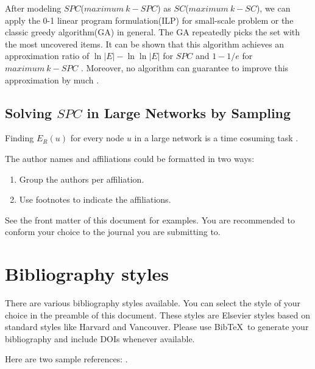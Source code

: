 \documentclass[review]{elsarticle}
\begin{document}
After modeling $SPC$($maximum \  k-SPC$) as $SC$($maximum \  k-SC$), we can apply the 0-1 linear program formulation(ILP) \cite{vazirani2013approximation} for small-scale problem or the classic greedy algorithm(GA)\cite{chvatal1979greedy} in general. The GA repeatedly picks the set with the most uncovered items.  It can be shown that this algorithm achieves an approximation ratio of $\ln |E|-\ln\ln |E|$ \cite{slavik1997tight} for $SPC$ and $1-1/e$ for $maximum \  k-SPC$ \cite{hochbaum1997approximating}. Moreover, no algorithm can guarantee to improve this approximation by much \cite{feige1998threshold}.

\subsection{Solving $SPC$ in Large Networks by Sampling}

Finding $E_R(u)$ for every node $u$ in a large network is a time cosuming task \cite{madkour2017survey, panda2018survey}. 




The author names and affiliations could be formatted in two ways:
\begin{enumerate}[(1)]
\item Group the authors per affiliation.
\item Use footnotes to indicate the affiliations.
\end{enumerate}
See the front matter of this document for examples. You are recommended to conform your choice to the journal you are submitting to.

\section{Bibliography styles}

There are various bibliography styles available. You can select the style of your choice in the preamble of this document. These styles are Elsevier styles based on standard styles like Harvard and Vancouver. Please use Bib\TeX\ to generate your bibliography and include DOIs whenever available.

Here are two sample references: \cite{Feynman1963118,Dirac1953888}.



\end{document}
